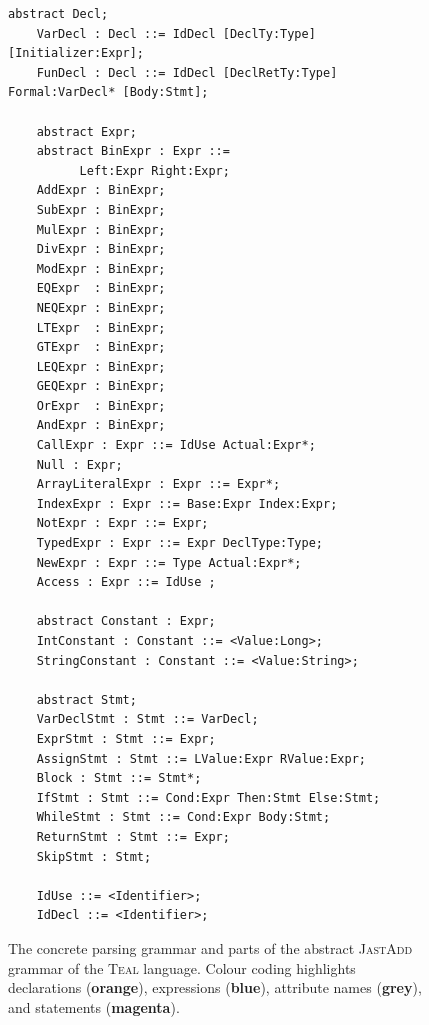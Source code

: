 \begin{figure}[H]
\begin{minipage}{0.8\textwidth}
\begin{lrbox}{\mylistingbox}
\begin{lstlisting}[language=ASTGrammar]
    abstract Decl;
    VarDecl : Decl ::= IdDecl [DeclTy:Type] [Initializer:Expr];
    FunDecl : Decl ::= IdDecl [DeclRetTy:Type] Formal:VarDecl* [Body:Stmt];

    abstract Expr;
    abstract BinExpr : Expr ::=
          Left:Expr Right:Expr;
    AddExpr : BinExpr;
    SubExpr : BinExpr;
    MulExpr : BinExpr;
    DivExpr : BinExpr;
    ModExpr : BinExpr;
    EQExpr  : BinExpr;
    NEQExpr : BinExpr;
    LTExpr  : BinExpr;
    GTExpr  : BinExpr;
    LEQExpr : BinExpr;
    GEQExpr : BinExpr;
    OrExpr  : BinExpr;
    AndExpr : BinExpr;
    CallExpr : Expr ::= IdUse Actual:Expr*;
    Null : Expr;
    ArrayLiteralExpr : Expr ::= Expr*;
    IndexExpr : Expr ::= Base:Expr Index:Expr;
    NotExpr : Expr ::= Expr;
    TypedExpr : Expr ::= Expr DeclType:Type;
    NewExpr : Expr ::= Type Actual:Expr*;
    Access : Expr ::= IdUse ;

    abstract Constant : Expr;
    IntConstant : Constant ::= <Value:Long>;
    StringConstant : Constant ::= <Value:String>;

    abstract Stmt;
    VarDeclStmt : Stmt ::= VarDecl;
    ExprStmt : Stmt ::= Expr;
    AssignStmt : Stmt ::= LValue:Expr RValue:Expr;
    Block : Stmt ::= Stmt*;
    IfStmt : Stmt ::= Cond:Expr Then:Stmt Else:Stmt;
    WhileStmt : Stmt ::= Cond:Expr Body:Stmt;
    ReturnStmt : Stmt ::= Expr;
    SkipStmt : Stmt;

    IdUse ::= <Identifier>;
    IdDecl ::= <Identifier>;
        \end{lstlisting}
\end{lrbox}
\scalebox{0.75}{\usebox{\mylistingbox}}

        \end{minipage}
\caption{\label{fig:tealGrammar} The concrete parsing grammar and parts of the abstract \textsc{JastAdd} grammar of the \textsc{Teal} language.
 Colour coding highlights declarations ({\bfseries\color{orange}orange}), expressions ({\bfseries\color{lightblue}blue}), 
 attribute names ({\bfseries\color{CadetBlue}grey}), and statements ({\bfseries\color{magenta}magenta}).}
\end{figure}


